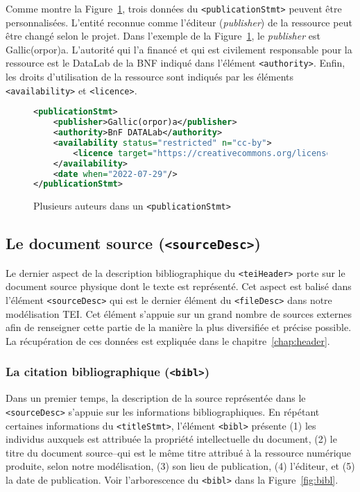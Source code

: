 \documentclass[class=article, crop=false]{standalone}
\begin{document}
Comme montre la Figure~\ref{fig:pubStmt}, trois données du \texttt{<publicationStmt>} peuvent être personnalisées. L'entité reconnue comme l'éditeur (\textit{publisher}) de la ressource peut être changé selon le projet. Dans l'exemple de la Figure~\ref{fig:pubStmt}, le \textit{publisher} est \og{}Gallic(orpor)a\fg{}. L'autorité qui l'a financé et qui est civilement responsable pour la ressource est le DataLab de la \acrshort{BNF} indiqué dans l'élément \texttt{<authority>}. Enfin, les droits d'utilisation de la ressource sont indiqués par les éléments \texttt{<availability>} et \texttt{<licence>}.

\begin{figure}[htp]
\centering
\begin{lstlisting}[language=XML]
<publicationStmt>
	<publisher>Gallic(orpor)a</publisher>
	<authority>BnF DATALab</authority>
	<availability status="restricted" n="cc-by">
		<licence target="https://creativecommons.org/licenses/by/4.0/"/>
	</availability>
	<date when="2022-07-29"/>
</publicationStmt>
\end{lstlisting}
\caption{Plusieurs auteurs dans un \texttt{<publicationStmt>}}
\label{fig:pubStmt}
\end{figure}


\subsection{Le document source (\texttt{<sourceDesc>})}
Le dernier aspect de la description bibliographique du \texttt{<teiHeader>} porte sur le document source physique dont le texte est représenté. Cet aspect est balisé dans l'élément \texttt{<sourceDesc>} qui est le dernier élément du \texttt{<fileDesc>} dans notre modélisation \acrshort{TEI}. Cet élément s'appuie sur un grand nombre de sources externes afin de renseigner cette partie de la manière la plus diversifiée et précise possible. La récupération de ces données est expliquée dans le chapitre~\ref{chap:header}.

\subsubsection{La citation bibliographique (\texttt{<bibl>})}

Dans un premier temps, la description de la source représentée dans le \texttt{<sourceDesc>} s'appuie sur les informations bibliographiques. En répétant certaines informations du \texttt{<titleStmt>}, l'élément  \texttt{<bibl>} présente (1) les individus auxquels est attribuée la propriété intellectuelle du document, (2) le titre du document source--qui est le même titre attribué à la ressource numérique produite, selon notre modélisation, (3) son lieu de publication, (4) l'éditeur, et (5) la date de publication. Voir l'arborescence du \texttt{<bibl>} dans la Figure~\ref{fig:bibl}.
\end{document}

